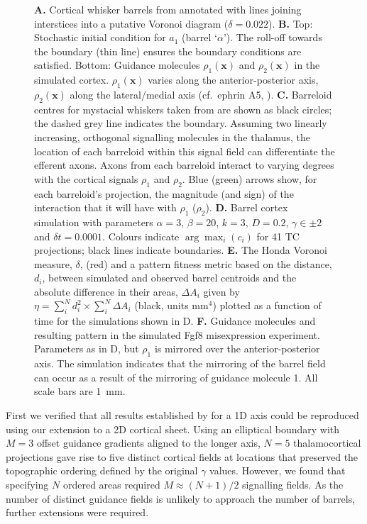 \documentclass[9pt,twocolumn,twoside,lineno]{pnas-new}
\begin{document}
\begin{figure}
\caption{\textbf{A.} Cortical whisker barrels from \cite{zheng_signal_2001}
  annotated with lines joining interstices into a putative Voronoi diagram
  ($\delta=0.022$). \textbf{B.}  Top: Stochastic initial condition for $a_1$
  (barrel `$\alpha$'). The roll-off towards the boundary (thin line) ensures
  the boundary conditions are satisfied. Bottom: Guidance molecules
  $\rho_1(\mathbf{x})$ and $\rho_2(\mathbf{x})$ in the simulated
  cortex. $\rho_1(\mathbf{x})$ varies along the anterior-posterior axis,
  $\rho_2(\mathbf{x})$ along the lateral/medial axis (cf.~ephrin A5,
  \cite{vanderhaeghen_mapping_2000}). \textbf{C.}  Barreloid centres for
  mystacial whiskers taken from \cite{haidarliu_size_2001} are shown as black
  circles; the dashed grey line indicates the boundary. Assuming two linearly
  increasing, orthogonal signalling molecules in the thalamus, the location of
  each barreloid within this signal field can differentiate the efferent
  axons. Axons from each barreloid interact to varying degrees with the
  cortical signals $\rho_1$ and $\rho_2$. Blue (green) arrows show, for each
  barreloid's projection, the magnitude (and sign) of the interaction that it
  will have with $\rho_1$ ($\rho_2$). \textbf{D.}  Barrel cortex simulation
  with parameters $\alpha=3$, $\beta=20$, $k=3$, $D=0.2$, $\gamma\in\pm 2$ and
  $\delta{t}=0.0001$. Colours indicate $\arg\max_i(c_i)$ for 41 TC
  projections; black lines indicate boundaries. \textbf{E.}
  The Honda Voronoi measure, $\delta$, (red) and a pattern fitness metric
  based on the distance, $d_i$, between simulated and observed barrel
  centroids and the absolute difference in their areas, $\Delta A_i$ given by
  $\eta = \sum_i^N d_i^2 \times \sum_i^N \Delta A_i$ (black, units mm$^4$)
  plotted as a function of time for the simulations shown in D. \textbf{F.}
  Guidance molecules and resulting pattern in the simulated Fgf8 misexpression
  experiment. Parameters as in D, but $\rho_1$ is mirrored over the
  anterior-posterior axis. The simulation indicates that the mirroring of the
  barrel field can occur as a result of the mirroring of guidance molecule 1.
  All scale bars are 1~mm.}
\label{fig:main}
\end{figure}

First we verified that all results established by \cite{karbowski_model_2004} for a 1D axis could be reproduced using our extension to a 2D cortical sheet. Using an elliptical boundary with $M=3$ offset guidance gradients aligned to the longer axis, $N=5$ thalamocortical projections gave rise to five distinct cortical fields at locations that preserved the topographic ordering defined by the original $\gamma$ values. However, we found that specifying $N$ ordered areas required $M\approx (N+1)/2$ signalling fields. As the number of distinct guidance fields is unlikely to approach the number of barrels, further extensions were required.
\end{document}
